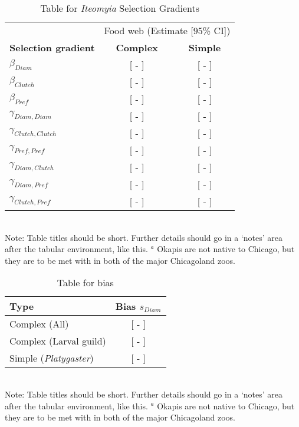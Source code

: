 \documentclass[11pt]{article}
\begin{document}
\begin{table}[h]
\caption{Table for \textit{Iteomyia} Selection Gradients}
\label{Table:Gradients}
\centering
\begin{tabular}{lcc}
                                                                                  \\ \hline
                                  & \multicolumn{2}{c}{Food web (Estimate [95\% CI])} \\
\textbf{Selection gradient}       & \textbf{Complex} & \textbf{Simple}            \\ \hline
$\beta_{Diam}$                    &  [ - ] &  [ - ] \\
$\beta_{Clutch}$                  &  [ - ] &  [ - ] \\
$\beta_{Pref}$                    &  [ - ] &  [ - ] \\
$\gamma_{Diam,Diam}$              &  [ - ] &  [ - ] \\
$\gamma_{Clutch,Clutch}$          &  [ - ] &  [ - ] \\
$\gamma_{Pref,Pref}$              &  [ - ] &  [ - ] \\
$\gamma_{Diam,Clutch}$            &  [ - ] &  [ - ] \\
$\gamma_{Diam,Pref}$              &  [ - ] &  [ - ] \\
$\gamma_{Clutch,Pref}$            &  [ - ] &  [ - ]            \\ \hline
\end{tabular}
\bigskip{}
\\
{\footnotesize Note: Table titles should be short. Further details should go in a `notes' area after the tabular environment, like this. $^a$ Okapis are not native to Chicago, but they are to be met with in both of the major Chicagoland zoos.}
\end{table}

\newpage{}

\begin{table}[h]
\caption{Table for bias}
\label{Table:Bias}
\centering
\begin{tabular}{lc}
                                                                  \\ \hline
\textbf{Type}                 & \textbf{Bias} \boldmath$s_{Diam}$ \\ \hline
Complex (All)                 &  [ - ] \\
Complex (Larval guild)        &  [ - ] \\
Simple (\textit{Platygaster}) &  [ - ]                  \\ \hline
\end{tabular}
\bigskip{}
\\
{\footnotesize Note: Table titles should be short. Further details should go in a `notes' area after the tabular environment, like this. $^a$ Okapis are not native to Chicago, but they are to be met with in both of the major Chicagoland zoos.}
\end{table}
\end{document}
